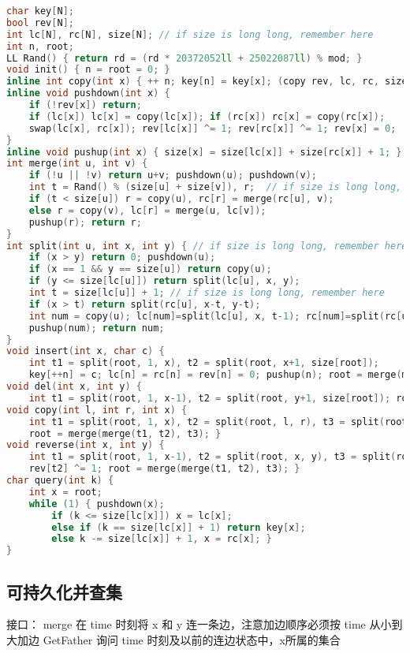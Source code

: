 \documentclass[landscape,a4paper]{article}
\begin{document}
\begin{lstlisting}[language=C++]
char key[N];
bool rev[N];
int lc[N], rc[N], size[N]; // if size is long long, remember here
int n, root;
LL Rand() { return rd = (rd * 20372052ll + 25022087ll) % mod; }
void init() { n = root = 0; }
inline int copy(int x) { ++ n; key[n] = key[x]; (copy rev, lc, rc, size); return n; }
inline void pushdown(int x) {
	if (!rev[x]) return;
	if (lc[x]) lc[x] = copy(lc[x]); if (rc[x]) rc[x] = copy(rc[x]);
	swap(lc[x], rc[x]); rev[lc[x]] ^= 1; rev[rc[x]] ^= 1; rev[x] = 0;
}
inline void pushup(int x) { size[x] = size[lc[x]] + size[rc[x]] + 1; }
int merge(int u, int v) {
	if (!u || !v) return u+v; pushdown(u); pushdown(v);
	int t = Rand() % (size[u] + size[v]), r;  // if size is long long, remember here
	if (t < size[u]) r = copy(u), rc[r] = merge(rc[u], v);
	else r = copy(v), lc[r] = merge(u, lc[v]);
	pushup(r); return r;
}
int split(int u, int x, int y) { // if size is long long, remember here
	if (x > y) return 0; pushdown(u);
	if (x == 1 && y == size[u]) return copy(u);
	if (y <= size[lc[u]]) return split(lc[u], x, y);
	int t = size[lc[u]] + 1; // if size is long long, remember here
	if (x > t) return split(rc[u], x-t, y-t);
	int num = copy(u); lc[num]=split(lc[u], x, t-1); rc[num]=split(rc[u], 1, y-t);
	pushup(num); return num;
}
void insert(int x, char c) {
	int t1 = split(root, 1, x), t2 = split(root, x+1, size[root]);
	key[++n] = c; lc[n] = rc[n] = rev[n] = 0; pushup(n); root = merge(merge(t1, n), t2); }
void del(int x, int y) {
	int t1 = split(root, 1, x-1), t2 = split(root, y+1, size[root]); root = merge(t1, t2); }
void copy(int l, int r, int x) {
	int t1 = split(root, 1, x), t2 = split(root, l, r), t3 = split(root, x+1, size[root]);
	root = merge(merge(t1, t2), t3); }
void reverse(int x, int y) {
	int t1 = split(root, 1, x-1), t2 = split(root, x, y), t3 = split(root, y+1, size[root]);
	rev[t2] ^= 1; root = merge(merge(t1, t2), t3); }
char query(int k) {
	int x = root;
	while (1) {	pushdown(x);
		if (k <= size[lc[x]]) x = lc[x];
		else if (k == size[lc[x]] + 1) return key[x];
		else k -= size[lc[x]] + 1, x = rc[x]; }
}
\end{lstlisting}
\subsection{可持久化并查集}

接口：
 merge 在 time 时刻将 x 和 y 连一条边，注意加边顺序必须按 time 从小到大加边
 GetFather 询问 time 时刻及以前的连边状态中，x所属的集合
\end{document}
